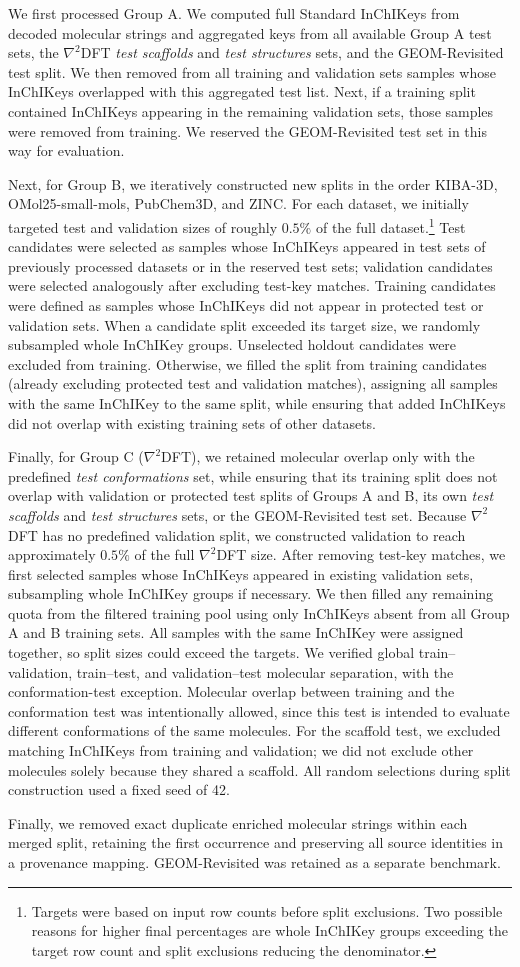We first processed Group A. We computed full Standard InChIKeys from decoded molecular strings and aggregated keys from all available Group A test sets, the $\nabla^2$DFT \emph{test scaffolds} and \emph{test structures} sets, and the GEOM-Revisited test split. We then removed from all training and validation sets samples whose InChIKeys overlapped with this aggregated test list. Next, if a training split contained InChIKeys appearing in the remaining validation sets, those samples were removed from training. We reserved the GEOM-Revisited test set in this way for evaluation.

Next, for Group B, we iteratively constructed new splits in the order KIBA-3D, OMol25-small-mols, PubChem3D, and ZINC. For each dataset, we initially targeted test and validation sizes of roughly $0.5\%$ of the full dataset.\footnote{Targets were based on input row counts before split exclusions. Two possible reasons for higher final percentages are whole InChIKey groups exceeding the target row count and split exclusions reducing the denominator.} Test candidates were selected as samples whose InChIKeys appeared in test sets of previously processed datasets or in the reserved test sets; validation candidates were selected analogously after excluding test-key matches. Training candidates were defined as samples whose InChIKeys did not appear in protected test or validation sets. When a candidate split exceeded its target size, we randomly subsampled whole InChIKey groups. Unselected holdout candidates were excluded from training. Otherwise, we filled the split from training candidates (already excluding protected test and validation matches), assigning all samples with the same InChIKey to the same split, while ensuring that added InChIKeys did not overlap with existing training sets of other datasets.

Finally, for Group C ($\nabla^2$DFT), we retained molecular overlap only with the predefined \emph{test conformations} set, while ensuring that its training split does not overlap with validation or protected test splits of Groups A and B, its own \emph{test scaffolds} and \emph{test structures} sets, or the GEOM-Revisited test set. Because $\nabla^2$DFT has no predefined validation split, we constructed validation to reach approximately $0.5\%$ of the full $\nabla^2$DFT size. After removing test-key matches, we first selected samples whose InChIKeys appeared in existing validation sets, subsampling whole InChIKey groups if necessary. We then filled any remaining quota from the filtered training pool using only InChIKeys absent from all Group A and B training sets. All samples with the same InChIKey were assigned together, so split sizes could exceed the targets. We verified global train--validation, train--test, and validation--test molecular separation, with the conformation-test exception. Molecular overlap between training and the conformation test was intentionally allowed, since this test is intended to evaluate different conformations of the same molecules. For the scaffold test, we excluded matching InChIKeys from training and validation; we did not exclude other molecules solely because they shared a scaffold. All random selections during split construction used a fixed seed of 42.

Finally, we removed exact duplicate enriched molecular strings within each merged split, retaining the first occurrence and preserving all source identities in a provenance mapping. GEOM-Revisited was retained as a separate benchmark.

